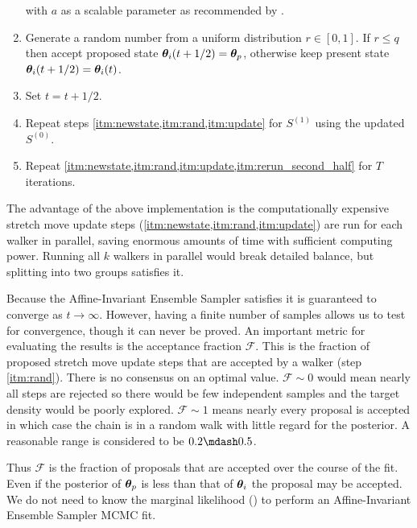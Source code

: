 \begin{enumerate}
\noindent with $a$ as a scalable parameter as recommended by .

\item \label{itm:rand} Generate a random number from a uniform distribution $r \in [0, 1]$.  If $r \leq q$ then accept proposed state
$\boldsymbol{\theta}_i(t + 1/2) = \boldsymbol{\theta}_p$, otherwise keep present state $\boldsymbol{\theta}_i(t + 1/2) = \boldsymbol{\theta}_i(t)$.

\item \label{itm:update}  Set $t = t + 1/2$.

\item \label{itm:rerun_second_half} Repeat steps \cref{itm:newstate,itm:rand,itm:update} for $S^{(1)}$ using the updated $S^{(0)}$.

\item Repeat \cref{itm:newstate,itm:rand,itm:update,itm:rerun_second_half} for $T$ iterations.
\end{enumerate}

The advantage of the above implementation is the computationally expensive stretch move update steps
(\cref{itm:newstate,itm:rand,itm:update}) are run
for each walker in parallel, saving enormous amounts of time with sufficient computing power.  Running all $k$ walkers in parallel would
break detailed balance, but splitting into two groups satisfies it.

Because the Affine-Invariant Ensemble Sampler satisfies  it is guaranteed
to converge as $t \rightarrow \infty$.  However, having a finite number of samples allows us to test for convergence,
though it can never be proved.  An important metric for evaluating the results is the acceptance fraction
$\mathcal{F}$.  This is the fraction of proposed stretch move update steps that are accepted by a walker (step \cref{itm:rand}).  There is
no consensus on an optimal value.  $\mathcal{F} \sim 0$ would mean nearly all steps are rejected so there would be few independent samples
and the target density would be poorly explored.  $\mathcal{F} \sim 1$ means nearly every proposal is accepted in which case
the chain is in a random walk with little regard for the posterior.  A reasonable range is considered to be $0.2 \mdash 0.5$.

Thus $\mathcal{F}$ is
the fraction of proposals that are accepted over the course of the fit.  Even if the posterior of $\boldsymbol{\theta}_p$ is less than
that of $\boldsymbol{\theta}_i$ the proposal may be accepted.  We do not need to know the marginal
likelihood () to perform an Affine-Invariant Ensemble Sampler MCMC
fit.

